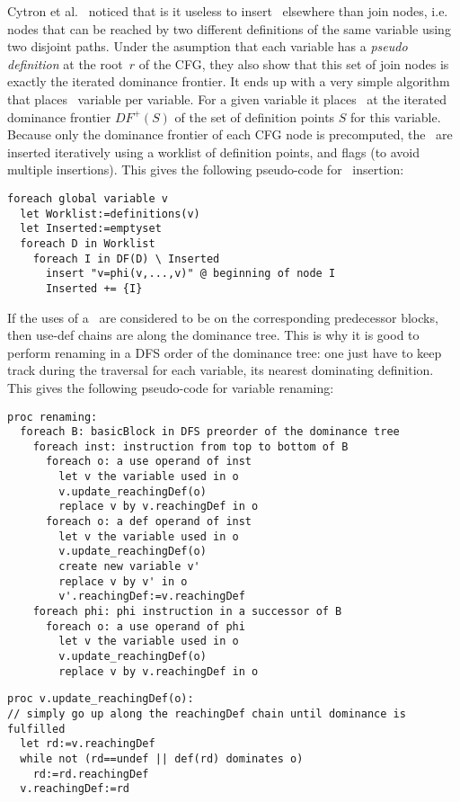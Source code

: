 Cytron et al.~\cite{cytron:1991:ssa} noticed that is it useless to insert \phiops\ elsewhere than join nodes, i.e. nodes that can be reached by two different definitions of the same variable using two disjoint paths. 
Under the asumption that each variable has a {\em pseudo definition} at the root~$r$ of the CFG, they also show that this set of join nodes is exactly the iterated dominance frontier.
It ends up with a very simple algorithm that places \phiops\ variable per variable. 
For a given variable it places \phiops\ at the iterated dominance frontier $DF^{+}(S)$ of the set of definition points $S$ for this variable. 
Because only the dominance frontier of each CFG node is precomputed, the \phiops\ are inserted iteratively using a worklist of definition points, and flags (to avoid multiple insertions). 
This gives the following pseudo-code for \phiops\ insertion:
\begin{verbatim}
foreach global variable v
  let Worklist:=definitions(v)
  let Inserted:=emptyset
  foreach D in Worklist
    foreach I in DF(D) \ Inserted
      insert "v=phi(v,...,v)" @ beginning of node I
      Inserted += {I}
\end{verbatim}

If the uses of a \phiop\ are considered to be on the corresponding predecessor blocks, then use-def chains are along the dominance tree. 
This is why it is good to perform renaming in a DFS order of the dominance tree: 
one just have to keep track during the traversal for each variable, its nearest dominating definition.
This gives the following pseudo-code for variable renaming:
\begin{verbatim}
proc renaming:
  foreach B: basicBlock in DFS preorder of the dominance tree
    foreach inst: instruction from top to bottom of B
      foreach o: a use operand of inst
        let v the variable used in o
        v.update_reachingDef(o)
        replace v by v.reachingDef in o
      foreach o: a def operand of inst
        let v the variable used in o
        v.update_reachingDef(o)
        create new variable v'
        replace v by v' in o
        v'.reachingDef:=v.reachingDef
    foreach phi: phi instruction in a successor of B
      foreach o: a use operand of phi
        let v the variable used in o
        v.update_reachingDef(o)
        replace v by v.reachingDef in o
\end{verbatim}

\begin{verbatim}
proc v.update_reachingDef(o):
// simply go up along the reachingDef chain until dominance is fulfilled 
  let rd:=v.reachingDef
  while not (rd==undef || def(rd) dominates o)
    rd:=rd.reachingDef
  v.reachingDef:=rd
\end{verbatim}

